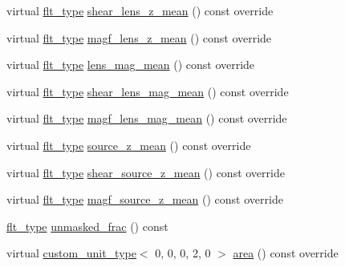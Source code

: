 \begin{DoxyCompactItemize}
virtual \hyperlink{lib_2IceBRG__main_2common_8h_ad0f130a56eeb944d9ef2692ee881ecc4}{flt\+\_\+type} \hyperlink{classIceBRG_1_1pair__bin_af44116024e6c5ccfc70052489ce4c571}{shear\+\_\+lens\+\_\+z\+\_\+mean} () const  override
\item 
virtual \hyperlink{lib_2IceBRG__main_2common_8h_ad0f130a56eeb944d9ef2692ee881ecc4}{flt\+\_\+type} \hyperlink{classIceBRG_1_1pair__bin_a78638c73d68374ddb55b9b33545eb5c4}{magf\+\_\+lens\+\_\+z\+\_\+mean} () const  override
\item 
virtual \hyperlink{lib_2IceBRG__main_2common_8h_ad0f130a56eeb944d9ef2692ee881ecc4}{flt\+\_\+type} \hyperlink{classIceBRG_1_1pair__bin_a9b29d62f7aa9071a223538ec5d7d0ca1}{lens\+\_\+mag\+\_\+mean} () const  override
\item 
virtual \hyperlink{lib_2IceBRG__main_2common_8h_ad0f130a56eeb944d9ef2692ee881ecc4}{flt\+\_\+type} \hyperlink{classIceBRG_1_1pair__bin_a9d1964015bcfba64d353be65cf8eb3b7}{shear\+\_\+lens\+\_\+mag\+\_\+mean} () const  override
\item 
virtual \hyperlink{lib_2IceBRG__main_2common_8h_ad0f130a56eeb944d9ef2692ee881ecc4}{flt\+\_\+type} \hyperlink{classIceBRG_1_1pair__bin_a712835cab9652c4516017478b2f3a760}{magf\+\_\+lens\+\_\+mag\+\_\+mean} () const  override
\item 
virtual \hyperlink{lib_2IceBRG__main_2common_8h_ad0f130a56eeb944d9ef2692ee881ecc4}{flt\+\_\+type} \hyperlink{classIceBRG_1_1pair__bin_a474b64625f7557ce1f6cdf8627da73f2}{source\+\_\+z\+\_\+mean} () const  override
\item 
virtual \hyperlink{lib_2IceBRG__main_2common_8h_ad0f130a56eeb944d9ef2692ee881ecc4}{flt\+\_\+type} \hyperlink{classIceBRG_1_1pair__bin_a06e896cc46423bc10c05521199c878f2}{shear\+\_\+source\+\_\+z\+\_\+mean} () const  override
\item 
virtual \hyperlink{lib_2IceBRG__main_2common_8h_ad0f130a56eeb944d9ef2692ee881ecc4}{flt\+\_\+type} \hyperlink{classIceBRG_1_1pair__bin_ad8a97f771bbb008e7e1fa7f88005e378}{magf\+\_\+source\+\_\+z\+\_\+mean} () const  override
\item 
\hyperlink{lib_2IceBRG__main_2common_8h_ad0f130a56eeb944d9ef2692ee881ecc4}{flt\+\_\+type} \hyperlink{classIceBRG_1_1pair__bin_ac1c89162f70ad44b767042e16c269983}{unmasked\+\_\+frac} () const 
\item 
virtual \hyperlink{namespaceIceBRG_a896bc1bf7e8db5ca045b9cf35912ca5e}{custom\+\_\+unit\+\_\+type}$<$ 0, 0, 0, 2, 0 $>$ \hyperlink{classIceBRG_1_1pair__bin_aebdbc6603f8df3ea242939c22919495d}{area} () const  override
\item 

\end{DoxyCompactItemize}

